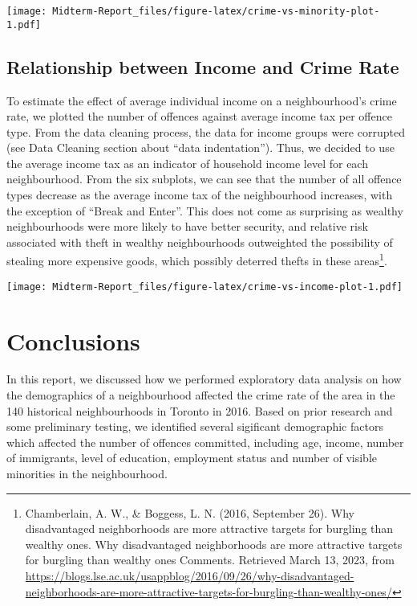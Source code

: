 \documentclass[
]{article}
\begin{document}
\texttt{[image: Midterm-Report\_files/figure-latex/crime-vs-minority-plot-1.pdf]}

\hypertarget{relationship-between-income-and-crime-rate}{%
\subsection{Relationship between Income and Crime
Rate}\label{relationship-between-income-and-crime-rate}}

To estimate the effect of average individual income on a neighbourhood's
crime rate, we plotted the number of offences against average income tax
per offence type. From the data cleaning process, the data for income
groups were corrupted (see Data Cleaning section about ``data
indentation''). Thus, we decided to use the average income tax as an
indicator of household income level for each neighbourhood. From the six
subplots, we can see that the number of all offence types decrease as
the average income tax of the neighbourhood increases, with the
exception of ``Break and Enter''. This does not come as surprising as
wealthy neighbourhoods were more likely to have better security, and
relative risk associated with theft in wealthy neighbourhoods
outweighted the possibility of stealing more expensive goods, which
possibly deterred thefts in these areas\footnote{Chamberlain, A. W., \&
  Boggess, L. N. (2016, September 26). Why disadvantaged neighborhoods
  are more attractive targets for burgling than wealthy ones. Why
  disadvantaged neighborhoods are more attractive targets for burgling
  than wealthy ones Comments. Retrieved March 13, 2023, from
  \url{https://blogs.lse.ac.uk/usappblog/2016/09/26/why-disadvantaged-neighborhoods-are-more-attractive-targets-for-burgling-than-wealthy-ones/}}.

\texttt{[image: Midterm-Report\_files/figure-latex/crime-vs-income-plot-1.pdf]}

\hypertarget{conclusions}{%
\section{Conclusions}\label{conclusions}}

In this report, we discussed how we performed exploratory data analysis
on how the demographics of a neighbourhood affected the crime rate of
the area in the 140 historical neighbourhoods in Toronto in 2016. Based
on prior research and some preliminary testing, we identified several
sigificant demographic factors which affected the number of offences
committed, including age, income, number of immigrants, level of
education, employment status and number of visible minorities in the
neighbourhood.
\end{document}
